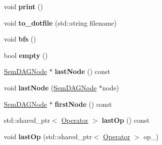 \begin{DoxyCompactItemize}
\item 
\hypertarget{class_semantic_d_a_g_a36fea89079fe2cc2b5e3ede3d18fec7f}{void {\bfseries print} ()}\label{class_semantic_d_a_g_a36fea89079fe2cc2b5e3ede3d18fec7f}

\item 
\hypertarget{class_semantic_d_a_g_aeb8e91600df76a367a889359c6d6f153}{void {\bfseries to\-\_\-dotfile} (std\-::string filename)}\label{class_semantic_d_a_g_aeb8e91600df76a367a889359c6d6f153}

\item 
\hypertarget{class_semantic_d_a_g_a09890ba4ecd3b7b7a63bb9877be3c244}{void {\bfseries bfs} ()}\label{class_semantic_d_a_g_a09890ba4ecd3b7b7a63bb9877be3c244}

\item 
\hypertarget{class_semantic_d_a_g_aed8ee7e8480adcec8667a264bcefb58c}{bool {\bfseries empty} ()}\label{class_semantic_d_a_g_aed8ee7e8480adcec8667a264bcefb58c}

\item 
\hypertarget{class_semantic_d_a_g_a9d3369eb56aaea911107704466cf8aec}{\hyperlink{class_sem_d_a_g_node}{\-Sem\-D\-A\-G\-Node} $\ast$ {\bfseries last\-Node} () const }\label{class_semantic_d_a_g_a9d3369eb56aaea911107704466cf8aec}

\item 
\hypertarget{class_semantic_d_a_g_ad3984fc7e22740fbcc3037b2bb2e00cc}{void {\bfseries last\-Node} (\hyperlink{class_sem_d_a_g_node}{\-Sem\-D\-A\-G\-Node} $\ast$node)}\label{class_semantic_d_a_g_ad3984fc7e22740fbcc3037b2bb2e00cc}

\item 
\hypertarget{class_semantic_d_a_g_a9d168ba1bab96cfac9ce2161d9808c7d}{\hyperlink{class_sem_d_a_g_node}{\-Sem\-D\-A\-G\-Node} $\ast$ {\bfseries first\-Node} () const }\label{class_semantic_d_a_g_a9d168ba1bab96cfac9ce2161d9808c7d}

\item 
\hypertarget{class_semantic_d_a_g_a49c425f5f51471dca674bc0856c05f27}{std\-::shared\-\_\-ptr$<$ \hyperlink{class_operator}{\-Operator} $>$ {\bfseries last\-Op} () const }\label{class_semantic_d_a_g_a49c425f5f51471dca674bc0856c05f27}

\item 
\hypertarget{class_semantic_d_a_g_a9c8a61c84df31d1b322f828619d65795}{void {\bfseries last\-Op} (std\-::shared\-\_\-ptr$<$ \hyperlink{class_operator}{\-Operator} $>$ op\-\_\-)}\label{class_semantic_d_a_g_a9c8a61c84df31d1b322f828619d65795}


\end{DoxyCompactItemize}
